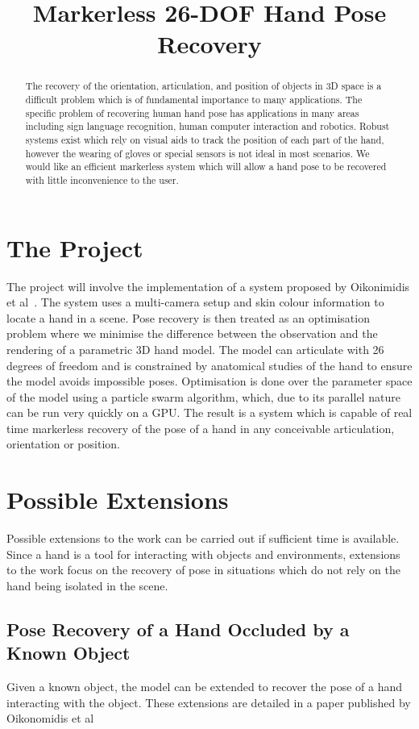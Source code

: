 \documentclass[a4paper]{article}
\title{Markerless 26-DOF Hand Pose Recovery}
\begin{document}
  \maketitle
  \begin{abstract}
    The recovery of the orientation, articulation, and position of objects in 3D space is a difficult problem which is of fundamental importance to many applications.  The specific problem of recovering human hand pose has applications in many areas including sign language recognition, human computer interaction and robotics.  Robust systems exist which rely on visual aids to track the position of each part of the hand, however the wearing of gloves or special sensors is not ideal in most scenarios.  We would like an efficient markerless system which will allow a hand pose to be recovered with little inconvenience to the user.
  \end{abstract}

  \section*{The Project}
  The project will involve the implementation of a system proposed by Oikonimidis et al~\cite{hand}.  The system uses a multi-camera setup and skin colour information to locate a hand in a scene.  Pose recovery is then treated as an optimisation problem where we minimise the difference between the observation and the rendering of a parametric 3D hand model.  The model can articulate with 26 degrees of freedom and is constrained by anatomical studies of the hand to ensure the model avoids impossible poses.  Optimisation is done over the parameter space of the model using a particle swarm algorithm, which, due to its parallel nature can be run very quickly on a GPU.  The result is a system which is capable of real time markerless recovery of the pose of a hand in any conceivable articulation, orientation or position.
  
  \section*{Possible Extensions}
    Possible extensions to the work can be carried out if sufficient time is available.  Since a hand is a tool for interacting with objects and environments, extensions to the work focus on the recovery of pose in situations which do not rely on the hand being isolated in the scene.
    \subsection*{Pose Recovery of a Hand Occluded by a Known Object}
    Given a known object, the model can be extended to recover the pose of a hand interacting with the object.  These extensions are detailed in a paper published by Oikonomidis et al~\cite{object}
\end{document}
